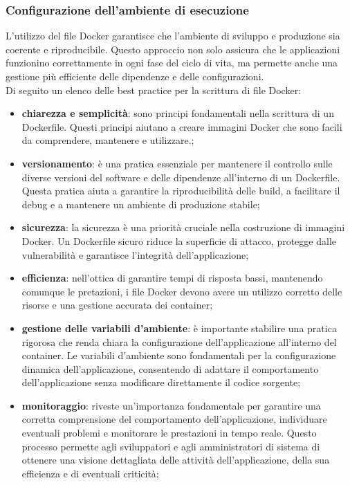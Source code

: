 \subsubsection{Configurazione dell'ambiente di esecuzione}
L'utilizzo del file Docker garantisce che l'ambiente di sviluppo e produzione sia coerente e riproducibile. Questo approccio non solo assicura che le applicazioni funzionino correttamente in ogni fase del ciclo di vita, ma permette anche una gestione più efficiente delle dipendenze e delle configurazioni.\\
Di seguito un elenco delle best practice per la scrittura di file Docker:
\begin{itemize}
	\item \textbf{chiarezza e semplicità}: sono principi fondamentali nella scrittura di un Dockerfile. Questi principi aiutano a creare immagini Docker che sono facili da comprendere, mantenere e utilizzare.;
	\item \textbf{versionamento}: è una pratica essenziale per mantenere il controllo sulle diverse versioni del software e delle dipendenze all'interno di un Dockerfile. Questa pratica aiuta a garantire la riproducibilità delle build, a facilitare il debug e a mantenere un ambiente di produzione stabile;
	\item \textbf{sicurezza}: la sicurezza è una priorità cruciale nella costruzione di immagini Docker. Un Dockerfile sicuro riduce la superficie di attacco, protegge dalle vulnerabilità e garantisce l'integrità dell'applicazione;
	\item \textbf{efficienza}: nell'ottica di garantire tempi di risposta bassi, mantenendo comunque le pretazioni, i file Docker devono avere un utilizzo corretto delle risorse e una gestione accurata dei container;
	\item \textbf{gestione delle variabili d'ambiente}: è importante stabilire una pratica rigorosa che renda chiara la configurazione dell'applicazione all'interno del container. Le variabili d'ambiente sono fondamentali per la configurazione dinamica dell'applicazione, consentendo di adattare il comportamento dell'applicazione senza modificare direttamente il codice sorgente;
	\item \textbf{monitoraggio}: riveste un'importanza fondamentale per garantire una corretta comprensione del comportamento dell'applicazione, individuare eventuali problemi e monitorare le prestazioni in tempo reale. Questo processo permette agli sviluppatori e agli amministratori di sistema di ottenere una visione dettagliata delle attività dell'applicazione, della sua efficienza e di eventuali criticità;

\end{itemize}
